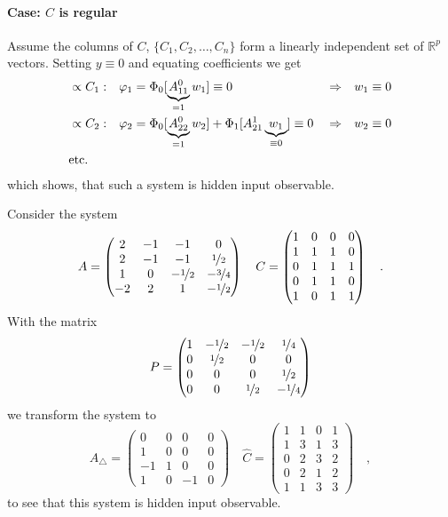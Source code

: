 \paragraph{Case: $C$ is regular}
	Assume the columns of $C$, $\{C_1,C_2,\ldots,C_n\}$ form a linearly independent set 
	of $\mathbb{R}^p$ vectors. Setting $y\equiv 0$ and equating coefficients we 
	get
	\begin{align}
	&\propto C_1:& & \varphi_1 = \Phi_0 [\underbrace{A^0_{11}}_{=1} w_1 ] \equiv 0 & &
	\Rightarrow &
	w_1 \equiv 0  \\
	&\propto C_2:& &\varphi_2= \Phi_0[\underbrace{A^0_{22}}_{=1} w_2] + 
	\Phi_1[ A^1_{21} \underbrace{w_1}_{\equiv 0} ] 
	 \equiv  0 & &
	\Rightarrow &
	w_2\equiv 0  \\
	&\text{etc.}  \notag
	\end{align}
	which shows, that such a system is hidden input observable.
	\begin{example}
	Consider the system
	\begin{equation}
	A =\begin{pmatrix}
	 2 & -1 & -1 & 0 \\ 2 & -1 & -1 & \nicefrac{1}{2} \\
	1 & 0 & -\nicefrac12 & -\nicefrac34\\ -2 & 2 & 1 & -\nicefrac12
	\end{pmatrix} \quad 
	C = \begin{pmatrix}
	1 & 0 & 0 & 0 \\ 1 & 1 & 1 & 0  \\ 0& 1 & 1 & 1\\ 0 &1 &1 &0\\ 1 &0&1&1
	\end{pmatrix} \quad .
	\end{equation}
	With the matrix
	\begin{equation}
	P = \begin{pmatrix}
	1 & -\nicefrac12 & -\nicefrac12 &\nicefrac14\\ 0 & \nicefrac12 & 0 &0\\ 0&0&0&
	\nicefrac12\\ 0& 0&\nicefrac12&-\nicefrac14
	\end{pmatrix}
	\end{equation}		
	we transform the system to
	\begin{equation}
	A_\triangle = \begin{pmatrix}
	0 & 0 &0 &0\\1&0&0&0\\-1&1&0&0\\1&0&-1&0
	\end{pmatrix}		\quad
	\hat{C} = \begin{pmatrix}
	1 & 1 & 0 & 1\\1&3&1&3\\0&2&3&2\\0&2&1&2\\1&1&3&3
	\end{pmatrix} \quad ,
	\end{equation}
	to see that this system is hidden input observable.
	\end{example}
